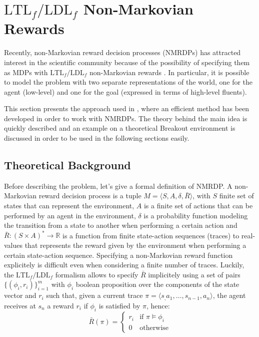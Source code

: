 \section{$\text{LTL}_f/\text{LDL}_f$ Non-Markovian Rewards}
Recently, non-Markovian reward decision processes (NMRDPs)
has attracted interest in the scientific community because of the possibility
of specifying them as MDPs with $\text{LTL}_f/\text{LDL}_f$ non-Markovian
rewards \cite{DBLP:journals/corr/abs-1807-06333}. In particular, it is possible
to model the problem with two separate representations of the world, one for
the agent (low-level) and one for the goal (expressed in terms of high-level
fluents).

This section presents the approach used in
\cite{DBLP:journals/corr/abs-1807-06333}, where an efficient method has been
developed in order to work with NMRDPs. The theory behind the main idea is
quickly described and an example on a theoretical Breakout environment is
discussed in order to be used in the following sections easily.

\subsection{Theoretical Background}
Before describing the problem, let's give a formal definition of NMRDP.
A non-Markovian reward decision process is a tuple $M = \langle S, A, \delta,
\bar{R} \rangle$, with $S$ finite set of states that can represent the
environment, $A$ is a finite set of actions that can be performed by an agent
in the environment, $\delta$ is a probability function modeling
the transition from a state to another when performing a certain action and
$\bar{R}: (S \times A)^* \rightarrow \mathbb{R}$ is a function from
finite state-action sequences (traces) to real-values that represents the
reward given by the environment when performing a certain state-action
sequence. Specifying a non-Markovian reward function explicitely is
difficult even when considering a finite number of traces. Luckily, the
$\text{LTL}_f/\text{LDL}_f$ formalism allows to specify $\bar{R}$
implicitely using a set of pairs $\{ (\phi_i, r_i) \}_{i=1}^m$ with
$\phi_i$ boolean
proposition over the components of the state vector and $r_i$ such that,
given a current trace $\pi = \langle s_, a_1, \dots, s_{n-1}, a_n \rangle$,
the agent receives at $s_n$ a reward $r_i$ if $\phi_i$ is satisfied by $\pi$,
hence:
\begin{equation}
    \bar{R}(\pi) =
        \begin{cases}
            r_i & \text{if } \pi \vDash \phi_i \\
            0 & \text{otherwise}
        \end{cases}
\end{equation}

